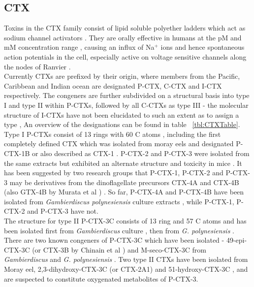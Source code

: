 \documentclass[12pt]{article}
\begin{document}
\subsection{CTX}
Toxins in the CTX family consist of lipid soluble polyether ladders which act as sodium channel activators \cite{dechraoui1999ciguatoxins}. They are orally effective in humans at the pM and mM concentration range \cite{molgo2000ciguatera}, causing an influx of Na$^{+}$ ions and hence spontaneous action potentials in the cell, especially active on voltage sensitive channels along the nodes of Ranvier \cite{sims1987theoretical,mattei1999neurotoxins,lewis1992action,molgo2000ciguatera}. \\	   
Currently CTXs are prefixed by their origin, where members from the Pacific, Caribbean and Indian ocean are designated P-CTX, C-CTX and I-CTX respectively. %
The congeners are further subdivided on a structural basis into type I and type II within P-CTXs, followed by all C-CTXs as type III - the molecular structure of I-CTXs have not been elucidated to such an extent as to assign a type \cite{legrand1997two,hamilton2002multiple,hamilton2002isolation}, An overview of the designations can be found in table ~\ref{tbl:CTXTable}.  \\
Type I P-CTXs consist of 13 rings with 60 C atoms \cite{murata1990structures,lewis1991purification,lewis1993origin}, including the first completely defined CTX which was isolated from moray eels and designated P-CTX-1B \cite{murata1990structures} or also described as CTX-1 \cite{lewis1991purification}. P-CTX-2 and P-CTX-3 were isolated from the same extracts but exhibited an alternate structure and toxicity in mice \cite{lewis1991purification}. It has been suggested by two research groups that P-CTX-1, P-CTX-2 and P-CTX-3 may be derivatives from the dinoflagellate precursors CTX-4A and CTX-4B (also GTX-4B by Murata et al \cite{murata1990structures}) \cite{lewis1993origin,yasumoto2000structural}. So far, P-CTX-4A and P-CTX-4B have been isolated from \emph{Gambierdiscus polynesiensis} culture extracts \cite{chinain2010growth}, while P-CTX-1, P-CTX-2 and P-CTX-3 have not. \\
The structure for type II P-CTX-3C consists of 13 ring and 57 C atoms and has been isolated first from \emph{Gambierdiscus} culture \cite{satake1993structure}, then from \emph{G. polynesiensis} \cite{chinain2010growth}. There are two known congeners of P-CTX-3C which have been isolated - 49-epi-CTX-3C (or CTX-3B by Chinain et al \cite{chinain2010growth}) and M-seco-CTX-3C from \emph{Gambierdiscus} \cite{satake1993structure} and \emph{G. polynesiensis} \cite{chinain2010growth}. Two type II CTXs have been isolated from Moray eel, 2,3-dihydroxy-CTX-3C (or CTX-2A1) and 51-hydroxy-CTX-3C \cite{satake1998isolation}, and are suspected to constitute oxygenated metabolites of P-CTX-3. \\ %
\end{document}

